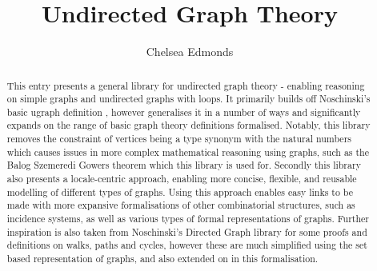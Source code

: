 \documentclass[11pt,a4paper]{article}
\begin{document}
\title{Undirected Graph Theory}
\author{Chelsea Edmonds}
\maketitle

\begin{abstract}
  This entry presents a general library for undirected graph theory - enabling reasoning on simple graphs and undirected graphs with loops. It primarily builds off Noschinski's basic ugraph definition \cite{noschinski_2012}, however generalises it in a number of ways and significantly expands on the range of basic graph theory definitions formalised. Notably, this library removes the constraint of vertices being a type synonym with the natural numbers which causes issues in more complex mathematical reasoning using graphs, such as the Balog Szemeredi Gowers theorem which this library is used for. Secondly this library also presents a locale-centric approach, enabling more concise, flexible, and reusable modelling of different types of graphs. Using this approach enables easy links to be made with more expansive formalisations of other combinatorial structures, such as incidence systems, as well as various types of formal representations of graphs. Further inspiration is also taken from Noschinski's \cite{noschinski_2015} Directed Graph library for some proofs and definitions on walks, paths and cycles, however these are much simplified using the set based representation of graphs, and also extended on in this formalisation. 
\end{abstract}

\tableofcontents





\end{document}
